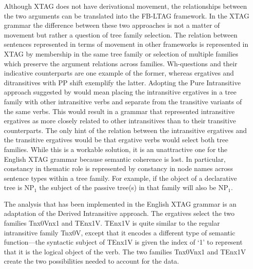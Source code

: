 Although XTAG does not have derivational movement, the relationships 
between the two arguments can be translated into the FB-LTAG framework.  In 
the XTAG grammar the difference between these two approaches is not a 
matter of movement but rather a question of tree family selection.  The 
relation between sentences represented in terms of movement in other 
frameworks is represented in XTAG by membership in the same tree family or 
selection of multiple families which preserve the argument relations across 
families. Wh-questions and their indicative counterparts are one example of 
the former, whereas ergatives and ditransitives with PP shift exemplify the 
latter.  Adopting the Pure Intransitive approach suggested by 
\cite{Napoli88} would mean placing the intransitive ergatives in a tree 
family with other intransitive verbs and separate from the transitive 
variants of the same verbs.  This would result in a grammar that 
represented intransitive ergatives as more closely related to other 
intransitives than to their transitive counterparts.  The only hint of the 
relation between the intransitive ergatives and the transitive ergatives 
would be that ergative verbs would select both tree families. While this is 
a workable solution, it is an unattractive one for the English XTAG grammar 
because semantic coherence is lost.  In particular, constancy in thematic 
role is represented by constancy in node names across sentence types within 
a tree family. For example, if the object of a declarative tree is NP$_{1}$ 
the subject of the passive tree(s) in that family will also be NP$_{1}$. 
 
The analysis that has been implemented in the English XTAG grammar is 
an adaptation of the Derived Intransitive approach.  The ergatives 
select the two families Tnx0Vnx1 and TEnx1V.  TEnx1V is quite similar 
to the regular intransitive family Tnx0V, except that it encodes a 
different type of semantic function---the syntactic subject of TEnx1V 
is given the index of `1' to represent that it is the logical object 
of the verb.  The two families Tnx0Vnx1 and TEnx1V create the two 
possibilities needed to account for the data. 
 
